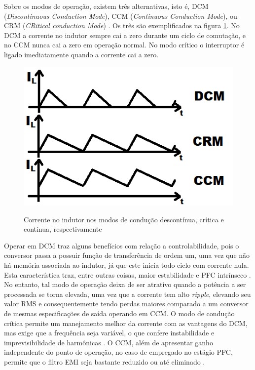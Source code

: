 \documentclass[
        12pt,
        openany, %
        oneside, %
        a4paper,			
        english,			
        brazil
        ]{abntbibufjf}
\begin{document}
Sobre os modos de operação, existem três alternativas, isto é, DCM (\textit{Discontinuous Conduction Mode}), CCM (\textit{Continuous Conduction Mode}), ou CRM (\textit{CRitical conduction Mode}) \cite{hart}. Os três são exemplificados na figura \ref{ccm_dcm}. No DCM a corrente no indutor sempre cai a zero durante um ciclo de comutação, e no CCM nunca cai a zero em operação normal. No modo crítico o interruptor é ligado imediatamente quando a corrente cai a zero.

\begin{figure}[h]
	\centering
	\caption{Corrente no indutor nos modos de condução descontínua, crítica e contínua, respectivamente}
	\includegraphics[scale=.8]{../GRAFICOS/dcm_ccm.png}\\
	\label{ccm_dcm}
\end{figure}


Operar em DCM traz alguns benefícios com relação a controlabilidade, pois o conversor passa a possuir função de transferência de ordem um, uma vez que não há memória associada ao indutor, já que este inicia todo ciclo com corrente nula. Esta característica traz, entre outras coisas, maior estabilidade e PFC intrínseco \cite{guilherme-dissert}. No entanto, tal modo de operação deixa de ser atrativo quando a potência a ser processada se torna elevada, uma vez que a corrente tem alto \textit{ripple}, elevando seu valor RMS e consequentemente tendo perdas maiores comparado a um conversor de mesmas especificações de saída operando em CCM. O modo de condução crítica permite um manejamento melhor da corrente com as vantagens do DCM, mas exige que a frequência seja variável, o que confere instabilidade e imprevisibilidade de harmônicas \cite{on}. O CCM, além de apresentar ganho independente do ponto de operação, no caso de empregado no estágio PFC, permite que o filtro EMI seja bastante reduzido ou até eliminado \cite{slua}.
\end{document}
